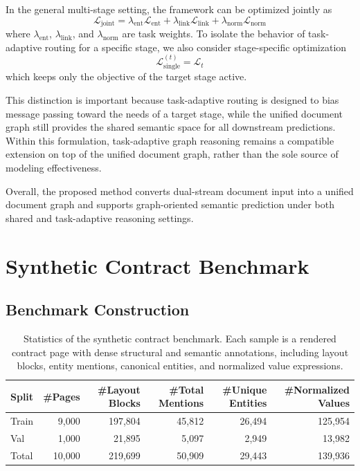 \documentclass[pdflatex,twocolumn,iicol,sn-vancouver-num]{sn-jnl}%
\theoremstyle{thmstyleone}%
\theoremstyle{thmstyletwo}%
\theoremstyle{thmstylethree}%
\begin{document}
In the general multi-stage setting, the framework can be optimized jointly as
\begin{equation}
\mathcal{L}_{\mathrm{joint}} = \lambda_{\mathrm{ent}} \mathcal{L}_{\mathrm{ent}} + \lambda_{\mathrm{link}} \mathcal{L}_{\mathrm{link}} + \lambda_{\mathrm{norm}} \mathcal{L}_{\mathrm{norm}}
\end{equation}
where \(\lambda_{\mathrm{ent}}\), \(\lambda_{\mathrm{link}}\), and \(\lambda_{\mathrm{norm}}\) are task weights. To isolate the behavior of task-adaptive routing for a specific stage, we also consider stage-specific optimization
\begin{equation}
\mathcal{L}_{\mathrm{single}}^{(t)} = \mathcal{L}_t
\end{equation}
which keeps only the objective of the target stage active.

This distinction is important because task-adaptive routing is designed to bias message passing toward the needs of a target stage, while the unified document graph still provides the shared semantic space for all downstream predictions. Within this formulation, task-adaptive graph reasoning remains a compatible extension on top of the unified document graph, rather than the sole source of modeling effectiveness.

Overall, the proposed method converts dual-stream document input into a unified document graph and supports graph-oriented semantic prediction under both shared and task-adaptive reasoning settings.

\section{Synthetic Contract Benchmark}

\subsection{Benchmark Construction}

\begin{table}[!t]
\centering
\caption{Statistics of the synthetic contract benchmark. Each sample is a rendered contract page with dense structural and semantic annotations, including layout blocks, entity mentions, canonical entities, and normalized value expressions.}
\label{tab:dataset_stats}
\begin{tabular}{lrrrrr}
\toprule
Split & \#Pages & \#Layout Blocks & \#Total Mentions & \#Unique Entities & \#Normalized Values \\
\midrule
Train & 9,000  & 197,804 & 45,812 & 26,494 & 125,954 \\
Val   & 1,000  & 21,895  & 5,097  & 2,949  & 13,982  \\
Total & 10,000 & 219,699 & 50,909 & 29,443 & 139,936 \\
\bottomrule
\end{tabular}
\end{table}
\end{document}
